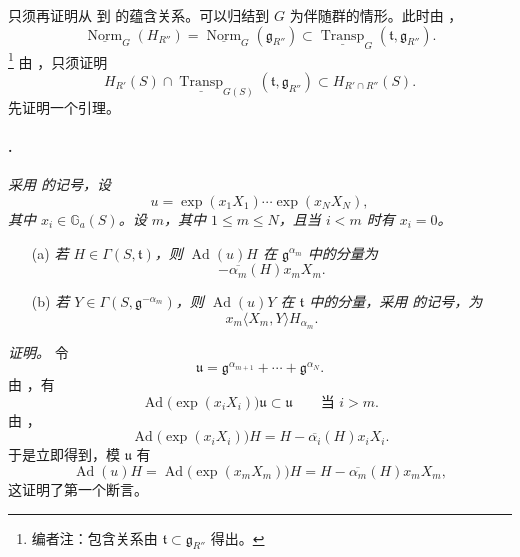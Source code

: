 只须再证明从 \textup{} 到 \textup{} 的蕴含关系。可以归结到 \(G\) 为伴随群的情形。此时由 ，
\[
  \underline{\operatorname{Norm}}_G(H_{R''})
  =
  \underline{\operatorname{Norm}}_G(\mathfrak g_{R''})
  \subset
  \underline{\operatorname{Transp}}_G
    (\mathfrak t,\mathfrak g_{R''}).
  \tag{39}\label{sga3:xxii:subsection:5-6:equation:39}
\]
\footnote{编者注：包含关系由 \(\mathfrak t\subset\mathfrak g_{R''}\) 得出。}
由 ，只须证明
\[
  H_{R'}(S)\cap
  \underline{\operatorname{Transp}}_{G(S)}
    (\mathfrak t,\mathfrak g_{R''})
  \subset
  H_{R'\cap R''}(S).
  \tag{x}\label{sga3:xxii:subsection:5-6:equation:x}
\]
先证明一个引理。

\paragraph{.}
\textit{采用  的记号，设}
\[
  u=\exp(x_1X_1)\cdots\exp(x_NX_N),
\]
\textit{其中 \(x_i\in\mathbb G_a(S)\)。设 \(m\)，其中 \(1\leq m\leq N\)，且当 \(i<m\) 时有 \(x_i=0\)。}
\begin{enumerate}
\item[\textup{\SGAInlineRefTarget{sga3:xxii:lem:5.6.2:item:a}(a)}]
\textit{若 \(H\in\Gamma(S,\mathfrak t)\)，则 \(\operatorname{Ad}(u)H\) 在 \(\mathfrak g^{\alpha_m}\) 中的分量为}
\[
  -\overline{\alpha_m}(H)x_mX_m.
\]

\item[\textup{(b)}]
\textit{若 \(Y\in\Gamma(S,\mathfrak g^{-\alpha_m})\)，则 \(\operatorname{Ad}(u)Y\) 在 \(\mathfrak t\) 中的分量，采用  的记号，为}
\[
  x_m\langle X_m,Y\rangle H_{\alpha_m}.
\]
\end{enumerate}

\textit{证明。}
令
\[
  \mathfrak u
  =
  \mathfrak g^{\alpha_{m+1}}+\cdots+\mathfrak g^{\alpha_N}.
\]
由 ，有
\[
  \operatorname{Ad}\bigl(\exp(x_iX_i)\bigr)\mathfrak u
  \subset\mathfrak u
  \qquad\text{当 }i>m.
\]
由 ，
\[
  \operatorname{Ad}\bigl(\exp(x_iX_i)\bigr)H
  =
  H-\overline{\alpha_i}(H)x_iX_i.
\]
于是立即得到，模 \(\mathfrak u\) 有
\[
  \operatorname{Ad}(u)H
  =
  \operatorname{Ad}\bigl(\exp(x_mX_m)\bigr)H
  =
  H-\overline{\alpha_m}(H)x_mX_m,
\]
这证明了第一个断言。

